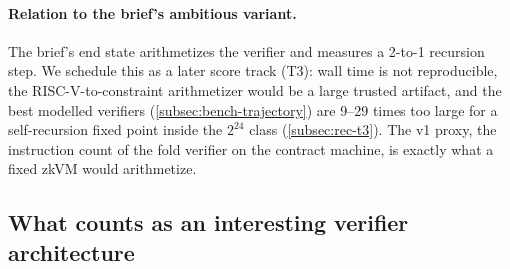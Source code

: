 \paragraph{Relation to the brief's ambitious variant.} The brief's end state arithmetizes the
verifier and measures a 2-to-1 recursion step. We schedule this as a later score track (T3): wall
time is not reproducible, the RISC-V-to-constraint arithmetizer would be a large trusted artifact,
and the best modelled verifiers (\cref{subsec:bench-trajectory}) are 9--29 times too large for a
self-recursion fixed point inside the $2^{24}$ class (\cref{subsec:rec-t3}). The v1 proxy, the
instruction count of the fold verifier on the contract machine, is exactly what a fixed zkVM would
arithmetize.

\subsection{What counts as an interesting verifier architecture}\label{subsec:obj-interesting}

